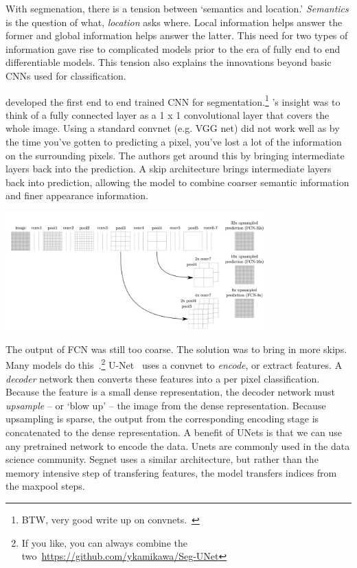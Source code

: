 \documentclass[12pt, a4paper, oneside, headinclude, footinclude]{article}
\begin{document}
With segmenation, there is a tension between `semantics and location.'
\textit{Semantics} is the question of what, \textit{location} asks where.
Local information helps answer the former and global information helps answer
the latter. This need for two types of information gave rise to complicated
models prior to the era of fully end to end differentiable models. This
tension also explains the innovations beyond basic CNNs used for
classification.

\cite{long2015fully} developed the first end to end trained CNN for
segmentation.\footnote{BTW, very good write up on
convnets.~\cite{long2015fully}} \cite{long2015fully}'s insight was to think of
a fully connected layer as a 1 x 1 convolutional layer that covers the whole
image. Using a standard convnet (e.g. VGG net) did not work well as by the
time you've gotten to predicting a pixel, you've lost a lot of the information
on the surrounding pixels. The authors get around this by bringing
intermediate layers back into the prediction. A skip architecture brings
intermediate layers back into prediction, allowing the model to combine
coarser semantic information and finer appearance information. 

\includegraphics[width=0.75\textwidth]{Figures/skip-segmentation.png}

The output of FCN was still too coarse. The solution was to bring in more
skips. Many models do this~\cite{segnet, unet}.\footnote{If you like, you can
always combine the two~\url{https://github.com/ykamikawa/Seg-UNet}}
U-Net~\cite{unet} uses a convnet to \textit{encode}, or extract features. A
\textit{decoder} network then converts these features into a per pixel
classification. Because the feature is a small dense representation, the
decoder network must \textit{upsample} -- or `blow up' -- the image from the
dense representation.  Because upsampling is sparse, the output from the
corresponding encoding stage is concatenated to the dense representation. A
benefit of UNets is that we can use any pretrained network to encode the data.
Unets are commonly used in the data science community. Segnet uses a similar
architecture, but rather than the memory intensive step of transfering
features, the model transfers indices from the maxpool steps.
\end{document}
